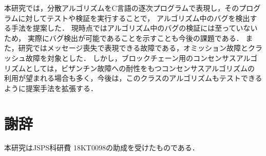 \documentclass[technicalreport]{ieicej}
\theoremstyle{plain}
\begin{document}
本研究では，分散アルゴリズムをC言語の逐次プログラムで表現し，そのプログラムに対してテストや検証を実行することで，
アルゴリズム中のバグを検出する手法を提案した．
現時点ではアルゴリズム中のバグの検証には至っていないため，
実際にバグ検出が可能であることを示すことも今後の課題である．
また，研究ではメッセージ喪失で表現できる故障である，オミッション故障とクラッシュ故障を対象とした．
しかし，ブロックチェーン用のコンセンサスアルゴリズムとしては，ビザンチン故障への耐性をもつコンセンサスアルゴリズムの
利用が望まれる場合も多く，今後は，このクラスのアルゴリズムもテストできるように提案手法を拡張する．

\section*{謝辞}
本研究はJSPS科研費 18KT0098の助成を受けたものである．





\end{document}
